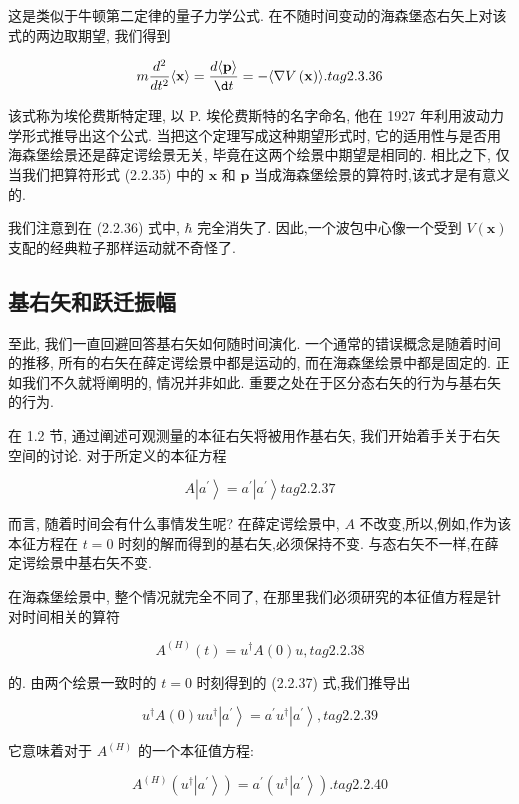 \documentclass[lang=cn,newtx,10pt,scheme=chinese,thmcnt=section]{elegantbook}
\begin{document}
这是类似于牛顿第二定律的量子力学公式. 在不随时间变动的海森堡态右矢上对该式的两边取期望, 我们得到

$$
m\frac{{d}^{2}}{d{t}^{2}}\langle \mathbf{x}\rangle = \frac{d\langle \mathbf{p}\rangle }{\d t} = - \langle \nabla V\left( \mathbf{x}\right) \rangle . tag{2.3.36}
$$

该式称为埃伦费斯特定理, 以 P. 埃伦费斯特的名字命名, 他在 1927 年利用波动力学形式推导出这个公式. 当把这个定理写成这种期望形式时, 它的适用性与是否用海森堡绘景还是薛定谔绘景无关, 毕竟在这两个绘景中期望是相同的. 相比之下, 仅当我们把算符形式 (2.2.35) 中的 $\mathbf{x}$ 和 $\mathbf{p}$ 当成海森堡绘景的算符时,该式才是有意义的.

我们注意到在 (2.2.36) 式中, $\hbar$ 完全消失了. 因此,一个波包中心像一个受到 $V\left( \mathbf{x}\right)$ 支配的经典粒子那样运动就不奇怪了.

\subsection*{基右矢和跃迁振幅}
至此, 我们一直回避回答基右矢如何随时间演化. 一个通常的错误概念是随着时间的推移, 所有的右矢在薛定谔绘景中都是运动的, 而在海森堡绘景中都是固定的. 正如我们不久就将阐明的, 情况并非如此. 重要之处在于区分态右矢的行为与基右矢的行为.

在 1.2 节, 通过阐述可观测量的本征右矢将被用作基右矢, 我们开始着手关于右矢空间的讨论. 对于所定义的本征方程

$$
A\left| {a}^{\prime }\right\rangle = {a}^{\prime }\left| {a}^{\prime }\right\rangle tag{2. 2.37}
$$

而言, 随着时间会有什么事情发生呢? 在薛定谔绘景中, $A$ 不改变,所以,例如,作为该本征方程在 $t = 0$ 时刻的解而得到的基右矢,必须保持不变. 与态右矢不一样,在薛定谔绘景中基右矢不变.

在海森堡绘景中, 整个情况就完全不同了, 在那里我们必须研究的本征值方程是针对时间相关的算符

$$
{A}^{\left( H\right) }\left( t\right) = {u}^{ \dagger }A\left( 0\right) u, tag{2. 2.38}
$$

的. 由两个绘景一致时的 $t = 0$ 时刻得到的 (2.2.37) 式,我们推导出

$$
{u}^{ \dagger }A\left( 0\right) u{u}^{ \dagger }\left| {a}^{\prime }\right\rangle = {a}^{\prime }{u}^{ \dagger }\left| {a}^{\prime }\right\rangle , tag{2.2.39}
$$

它意味着对于 ${A}^{\left( H\right) }$ 的一个本征值方程:

$$
{A}^{\left( H\right) }\left( {{u}^{ \dagger }\left| {a}^{\prime }\right\rangle }\right) = {a}^{\prime }\left( {{u}^{ \dagger }\left| {a}^{\prime }\right\rangle }\right) . tag{2.2.40}
$$
\end{document}
